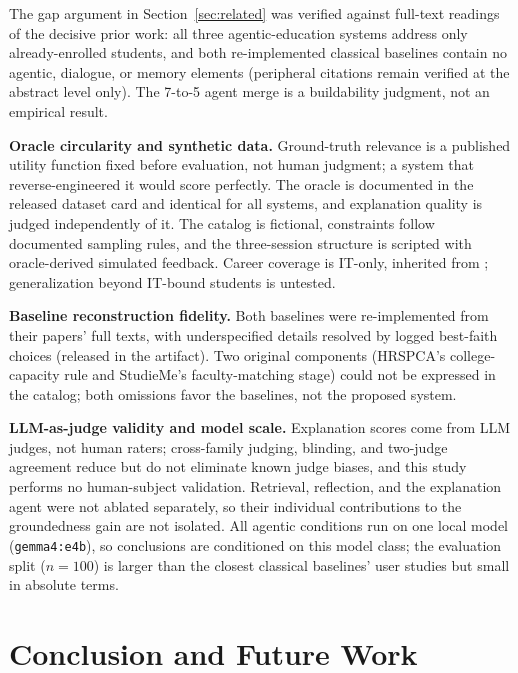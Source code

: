 \documentclass[conference]{IEEEtran}
\begin{document}
The gap argument in Section~\ref{sec:related} was verified against full-text readings of
the decisive prior work: all three agentic-education systems
\cite{advisingwise,agenticedurec,onlinecoursemaskg} address only already-enrolled students,
and both re-implemented classical baselines \cite{hrspca,studieme} contain no agentic,
dialogue, or memory elements (peripheral citations remain verified at the abstract level
only). The 7-to-5 agent merge is a buildability judgment, not an empirical result.

\textbf{Oracle circularity and synthetic data.} Ground-truth relevance is a published
utility function fixed before evaluation, not human judgment; a system that
reverse-engineered it would score perfectly. The oracle is documented in the released
dataset card and identical for all systems, and explanation quality is judged
independently of it. The catalog is fictional, constraints follow documented sampling
rules, and the three-session structure is scripted with oracle-derived simulated feedback.
Career coverage is IT-only, inherited from \cite{careerrecfeatureselection};
generalization beyond IT-bound students is untested.

\textbf{Baseline reconstruction fidelity.} Both baselines were re-implemented from their
papers' full texts, with underspecified details resolved by logged best-faith choices
(released in the artifact). Two original components (HRSPCA's college-capacity rule and
StudieMe's faculty-matching stage) could not be expressed in the catalog; both omissions
favor the baselines, not the proposed system.

\textbf{LLM-as-judge validity and model scale.} Explanation scores come from LLM judges,
not human raters; cross-family judging, blinding, and two-judge agreement reduce but do
not eliminate known judge biases, and this study performs no human-subject validation.
Retrieval, reflection, and the explanation agent were not ablated separately, so their
individual contributions to the groundedness gain are not isolated. All
agentic conditions run on one local model (\texttt{gemma4:e4b}), so conclusions are
conditioned on this model class; the evaluation split ($n=100$) is larger than the closest
classical baselines' user studies but small in absolute terms.

\section{Conclusion and Future Work}
\label{sec:conclusion}
\end{document}
